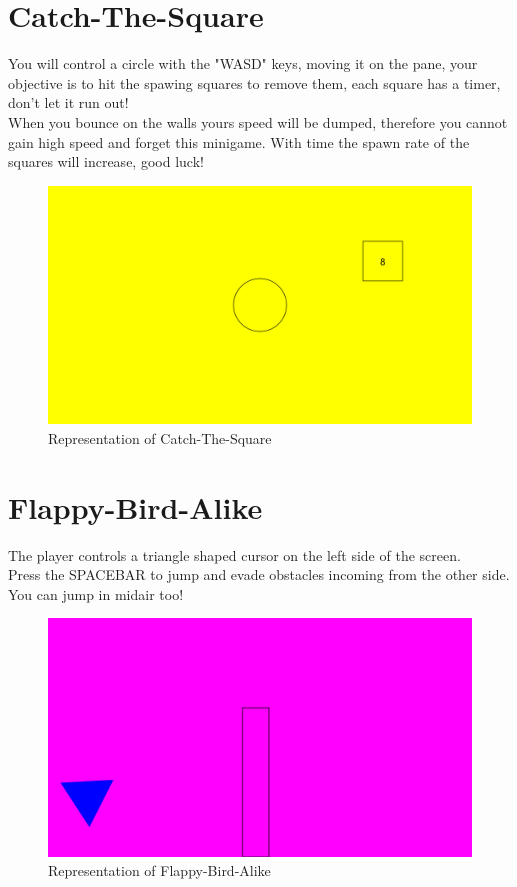 \documentclass[a4paper,12pt]{report}
\begin{document}
\section*{Catch-The-Square}
You will control a circle with the "WASD" keys, moving it on the pane, your objective is to hit the spawing squares to remove them, each square has a timer, don't let it run out!\\
When you bounce on the walls yours speed will be dumped, therefore you cannot gain high speed and forget this minigame.
With time the spawn rate of the squares will increase, good luck!
\begin{figure}[H]
	\centering{}
	\includegraphics[width=330pt]{res/Cts.png}
	\caption{Representation of Catch-The-Square}
\end{figure}
\section*{Flappy-Bird-Alike}
The player controls a triangle shaped cursor on the left side of the screen.\\
Press the SPACEBAR to jump and evade obstacles incoming from the other side. You can jump in midair too!
\begin{figure}[H]
	\centering{}
	\includegraphics[width=330pt]{res/Fba.png}
	\caption{Representation of Flappy-Bird-Alike}
\end{figure}
\end{document}
